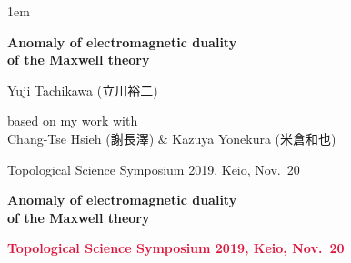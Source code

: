 \documentclass[xcolor={svgnames,rgb}]{beamer}
\date[]{}
\def\bff{\ifmmode\else\bfseries\fi}
\def\red#1{\textcolor{Crimson}{\bff #1}}
\def\blue#1{\textcolor{myblue}{\bff #1}}
\def\alert#1{\red{#1}}
\begin{document}
\parskip1em 
\boldmath
\def\baselinestretch{1.1}



\def\incb#1{\vcenter{\hbox{\texttt{[image: \#1]}}}}
\def\inc#1{\vcenter{\hbox{\texttt{[image: \#1]}}}}
\def\incx#1{\vcenter{\hbox{\texttt{[image: \#1]}}}}
\def\incc#1{\vcenter{\hbox{\texttt{[image: \#1]}}}}


{%
\begin{frame}
\vbox{}
\vfill
\begin{center}
\bfseries\huge\color{White} Anomaly of electromagnetic duality \\
of the Maxwell theory

\bigskip\bigskip\bigskip

\large Yuji Tachikawa (立川裕二)

{based on my work with} \\
{Chang-Tse Hsieh (謝長澤) \& Kazuya Yonekura (米倉和也)}

\bigskip\bigskip

Topological Science Symposium 2019, Keio, Nov.~20
\end{center}
\vfill
\vbox{}
\end{frame}
}

\begin{frame}
\bigskip\bigskip\bigskip\bigskip\bigskip

\vfill


\begin{exampleblock}{}
\begin{center}\LARGE\bfseries
\color{math}
Anomaly of electromagnetic duality \\
of the Maxwell theory
\end{center}
\end{exampleblock}

\bigskip\bigskip\bigskip
\begin{center}
\large  \blue{}


\bigskip
\large \alert{Topological Science Symposium 2019, Keio, Nov.~20}

\end{center}
\bigskip\bigskip\bigskip
\vfill


\end{frame}
\fi
\end{document}
